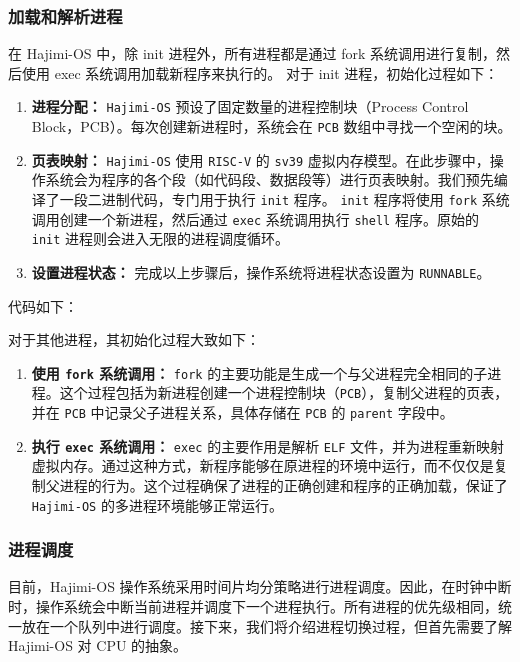 \documentclass[UTF8]{article}
\begin{document}
      \subsubsection{加载和解析进程}
      在 Hajimi-OS 中，除 init 进程外，所有进程都是通过 fork 系统调用进行复制，然后使用 exec 系统调用加载新程序来执行的。
      对于 init 进程，初始化过程如下：
      \begin{enumerate}[label=\textbf{\arabic*}., wide, labelwidth=!, labelindent=0pt]
        \item \textbf{进程分配：} \texttt{Hajimi-OS} 预设了固定数量的进程控制块（Process Control Block，PCB）。每次创建新进程时，系统会在 \texttt{PCB} 数组中寻找一个空闲的块。
        \item \textbf{页表映射：} \texttt{Hajimi-OS} 使用 \texttt{RISC-V} 的 \texttt{sv39} 虚拟内存模型。在此步骤中，操作系统会为程序的各个段（如代码段、数据段等）进行页表映射。我们预先编译了一段二进制代码，专门用于执行 \texttt{init} 程序。 \texttt{init} 程序将使用 \texttt{fork} 系统调用创建一个新进程，然后通过 \texttt{exec} 系统调用执行 \texttt{shell} 程序。原始的 \texttt{init} 进程则会进入无限的进程调度循环。
        \item \textbf{设置进程状态：} 完成以上步骤后，操作系统将进程状态设置为 \texttt{RUNNABLE}。
      \end{enumerate}
      代码如下：
      
      对于其他进程，其初始化过程大致如下：
      \begin{enumerate}[label=\textbf{\arabic*}., wide, labelwidth=!, labelindent=0pt]
        \item \textbf{使用 \texttt{fork} 系统调用：} \texttt{fork} 的主要功能是生成一个与父进程完全相同的子进程。这个过程包括为新进程创建一个进程控制块（\texttt{PCB}），复制父进程的页表，并在 \texttt{PCB} 中记录父子进程关系，具体存储在 \texttt{PCB} 的 \texttt{parent} 字段中。
        \item \textbf{执行 \texttt{exec} 系统调用：} \texttt{exec} 的主要作用是解析 \texttt{ELF} 文件，并为进程重新映射虚拟内存。通过这种方式，新程序能够在原进程的环境中运行，而不仅仅是复制父进程的行为。这个过程确保了进程的正确创建和程序的正确加载，保证了 \texttt{Hajimi-OS} 的多进程环境能够正常运行。
      \end{enumerate}

      \subsubsection{进程调度}
      目前，Hajimi-OS 操作系统采用时间片均分策略进行进程调度。因此，在时钟中断时，操作系统会中断当前进程并调度下一个进程执行。所有进程的优先级相同，统一放在一个队列中进行调度。接下来，我们将介绍进程切换过程，但首先需要了解 Hajimi-OS 对 CPU 的抽象。
\end{document}

